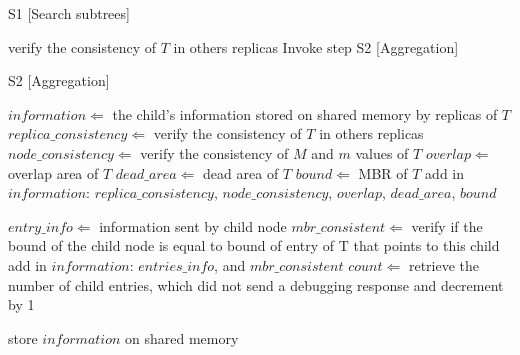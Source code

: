 \medskip
\begin{center}
\begin{minipage}{1\textwidth}
\begin{algorithm2e}[H]
\SetAlFnt{\small\sf}
 \DontPrintSemicolon
 \LinesNumbered
\SetAlgoLined
 \BlankLine
 \BlankLine

 S1 [Search subtrees]

{
  verify the consistency of $T$ in others replicas\;
      Invoke step S2 [Aggregation]\;
}

S2 [Aggregation]

$information \Leftarrow$ the child's information stored on shared memory by replicas of $T$\;
$replica\_consistency \Leftarrow$ verify the consistency of $T$ in others replicas\;
$node\_consistency \Leftarrow$	verify the consistency of $M$ and $m$ values of  $T$\;
$overlap \Leftarrow$ overlap area of $T$\;
$dead\_area \Leftarrow$ dead area of $T$\;
$bound \Leftarrow$ MBR of $T$\;
add in $information$: $replica\_consistency$, $node\_consistency$, $overlap$, $dead\_area$, $bound$\;

{
$entry\_info \Leftarrow$ information sent by child node\;
$mbr\_consistent \Leftarrow$ verify if the bound of the child node is equal to bound of entry of T that points to this child\;
add in $information$: $entries\_info$, and $mbr\_consistent$\;
$count \Leftarrow$ retrieve the number of child entries, which did not send a debugging response and decrement by 1\;

{
store $information$ on shared memory\;
}
          
}
\caption{$RDebug(T)$ 
\label {alg:rdebug}}
\end{algorithm2e}
\end{minipage}
\end{center}

